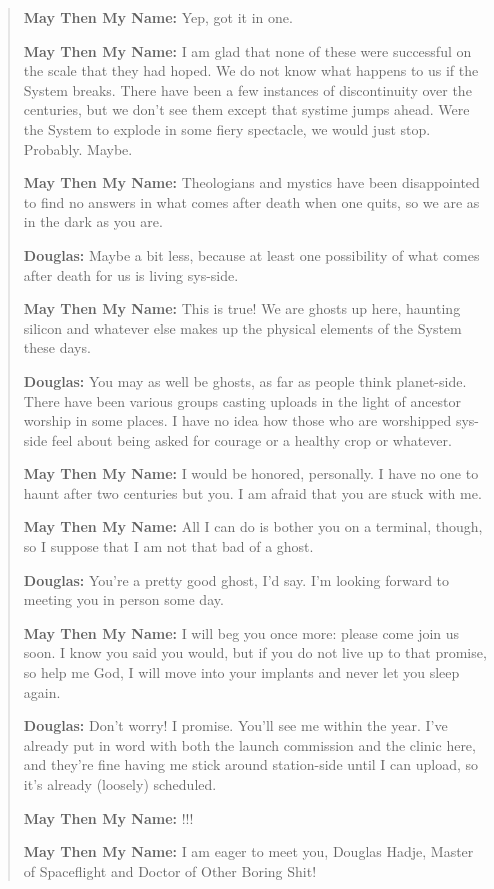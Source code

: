\begin{quote}
\textbf{May Then My Name:} Yep, got it in one.

\textbf{May Then My Name:} I am glad that none of these were successful on the scale that they had hoped. We do not know what happens to us if the System breaks. There have been a few instances of discontinuity over the centuries, but we don't see them except that systime jumps ahead. Were the System to explode in some fiery spectacle, we would just stop. Probably. Maybe.

\textbf{May Then My Name:} Theologians and mystics have been disappointed to find no answers in what comes after death when one quits, so we are as in the dark as you are.

\textbf{Douglas:} Maybe a bit less, because at least one possibility of what comes after death for us is living sys-side.

\textbf{May Then My Name:} This is true! We are ghosts up here, haunting silicon and whatever else makes up the physical elements of the System these days.

\textbf{Douglas:} You may as well be ghosts, as far as people think planet-side. There have been various groups casting uploads in the light of ancestor worship in some places. I have no idea how those who are worshipped sys-side feel about being asked for courage or a healthy crop or whatever.

\textbf{May Then My Name:} I would be honored, personally. I have no one to haunt after two centuries but you. I am afraid that you are stuck with me.

\textbf{May Then My Name:} All I can do is bother you on a terminal, though, so I suppose that I am not that bad of a ghost.

\textbf{Douglas:} You're a pretty good ghost, I'd say. I'm looking forward to meeting you in person some day.

\textbf{May Then My Name:} I will beg you once more: please come join us soon. I know you said you would, but if you do not live up to that promise, so help me God, I will move into your implants and never let you sleep again.

\textbf{Douglas:} Don't worry! I promise. You'll see me within the year. I've already put in word with both the launch commission and the clinic here, and they're fine having me stick around station-side until I can upload, so it's already (loosely) scheduled.

\textbf{May Then My Name:} !!!

\textbf{May Then My Name:} I am eager to meet you, Douglas Hadje, Master of Spaceflight and Doctor of Other Boring Shit!


\end{quote}
